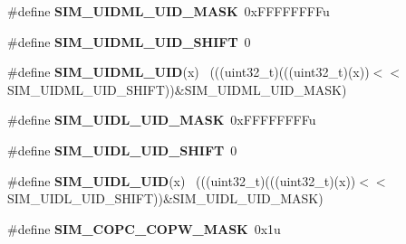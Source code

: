 \begin{DoxyCompactItemize}
\item 
\hypertarget{group___s_i_m___register___masks_ga87fba538d2482490ddfdb1ef8a44ec66}{}\#define {\bfseries S\+I\+M\+\_\+\+U\+I\+D\+M\+L\+\_\+\+U\+I\+D\+\_\+\+M\+A\+S\+K}~0x\+F\+F\+F\+F\+F\+F\+F\+Fu\label{group___s_i_m___register___masks_ga87fba538d2482490ddfdb1ef8a44ec66}

\item 
\hypertarget{group___s_i_m___register___masks_gacedaca5a049852ee395767e70f806c14}{}\#define {\bfseries S\+I\+M\+\_\+\+U\+I\+D\+M\+L\+\_\+\+U\+I\+D\+\_\+\+S\+H\+I\+F\+T}~0\label{group___s_i_m___register___masks_gacedaca5a049852ee395767e70f806c14}

\item 
\hypertarget{group___s_i_m___register___masks_ga875e571a37940db5491a13808878ccf0}{}\#define {\bfseries S\+I\+M\+\_\+\+U\+I\+D\+M\+L\+\_\+\+U\+I\+D}(x)                                              ~(((uint32\+\_\+t)(((uint32\+\_\+t)(x))$<$$<$S\+I\+M\+\_\+\+U\+I\+D\+M\+L\+\_\+\+U\+I\+D\+\_\+\+S\+H\+I\+F\+T))\&S\+I\+M\+\_\+\+U\+I\+D\+M\+L\+\_\+\+U\+I\+D\+\_\+\+M\+A\+S\+K)\label{group___s_i_m___register___masks_ga875e571a37940db5491a13808878ccf0}

\item 
\hypertarget{group___s_i_m___register___masks_ga412340eabbcd0f0d48ce4886e9beb071}{}\#define {\bfseries S\+I\+M\+\_\+\+U\+I\+D\+L\+\_\+\+U\+I\+D\+\_\+\+M\+A\+S\+K}~0x\+F\+F\+F\+F\+F\+F\+F\+Fu\label{group___s_i_m___register___masks_ga412340eabbcd0f0d48ce4886e9beb071}

\item 
\hypertarget{group___s_i_m___register___masks_ga6fb1383717ebfa6f47b5a5952fd21d63}{}\#define {\bfseries S\+I\+M\+\_\+\+U\+I\+D\+L\+\_\+\+U\+I\+D\+\_\+\+S\+H\+I\+F\+T}~0\label{group___s_i_m___register___masks_ga6fb1383717ebfa6f47b5a5952fd21d63}

\item 
\hypertarget{group___s_i_m___register___masks_gadf1a47bfdde94787a3e6e785332aef8e}{}\#define {\bfseries S\+I\+M\+\_\+\+U\+I\+D\+L\+\_\+\+U\+I\+D}(x)                                                ~(((uint32\+\_\+t)(((uint32\+\_\+t)(x))$<$$<$S\+I\+M\+\_\+\+U\+I\+D\+L\+\_\+\+U\+I\+D\+\_\+\+S\+H\+I\+F\+T))\&S\+I\+M\+\_\+\+U\+I\+D\+L\+\_\+\+U\+I\+D\+\_\+\+M\+A\+S\+K)\label{group___s_i_m___register___masks_gadf1a47bfdde94787a3e6e785332aef8e}

\item 
\hypertarget{group___s_i_m___register___masks_gabea5c1af6c493fe6e417dd6c3eba4ad6}{}\#define {\bfseries S\+I\+M\+\_\+\+C\+O\+P\+C\+\_\+\+C\+O\+P\+W\+\_\+\+M\+A\+S\+K}~0x1u\label{group___s_i_m___register___masks_gabea5c1af6c493fe6e417dd6c3eba4ad6}


\end{DoxyCompactItemize}
